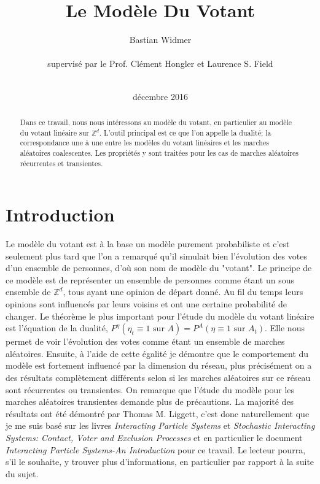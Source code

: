 \documentclass[a4paper,11pt]{article}
\title{Le Modèle Du Votant}
\author{Bastian Widmer\\
\\
supervisé par le Prof. Clément Hongler et Laurence S. Field\\
\\}
\date{décembre 2016}
\theoremstyle{break}
\theoremstyle{break}
\theoremstyle{definition}
\theoremstyle{remark}
\begin{document}
\maketitle

\begin{abstract}
Dans ce travail, nous nous intéressons au modèle du votant, en particulier au modèle du votant linéaire sur $\mathbb{Z}^d$. L'outil principal est ce que l'on appelle la dualité; la correspondance une à une entre les modèles du votant linéaires et les marches aléatoires coalescentes. Les propriétés y sont traitées pour les cas de marches aléatoires récurrentes et transientes.
\end{abstract}


\section*{Introduction}
Le modèle du votant est à la base un modèle purement probabiliste et c'est seulement plus tard que l'on a remarqué qu'il simulait bien l'évolution des votes d'un ensemble de personnes, d'où son nom de modèle du "votant". Le principe de ce modèle est de représenter un ensemble de personnes comme étant un sous ensemble de $\mathbb{Z}^d$, tous ayant une opinion de départ donné. Au fil du temps leurs opinions sont influencés par leurs voisins et ont une certaine probabilité de changer. Le théorème le plus important pour l'étude du modèle du votant linéaire est l'équation de la dualité, $P^\eta (\eta_t \equiv 1 \text{ sur } A) = P^A (\eta \equiv 1 \text{ sur } A_t)$. Elle nous permet de voir l'évolution des votes comme étant un ensemble de marches aléatoires. Ensuite, à l'aide de cette égalité je démontre que le comportement du modèle est fortement influencé par la dimension du réseau, plus précisément on a des résultats complètement différents selon si les marches aléatoires sur ce réseau sont récurrentes ou transientes. On remarque que l'étude du modèle pour les marches aléatoires transientes demande plus de précautions. La majorité des résultats ont été démontré par Thomas M. Liggett, c'est donc naturellement que je me suis basé sur les livres \textit{Interacting Particle Systems} \cite{liggett2012interacting} et \textit{Stochastic Interacting Systems: Contact, Voter and Exclusion Processes} \cite{liggett1999stochastic} et en particulier le document \textit{Interacting Particle Systems-An Introduction} \cite{Liggettpdf} pour ce travail. Le lecteur pourra, s'il le souhaite, y trouver plus d'informations, en particulier par rapport à la suite du sujet.
\end{document}
